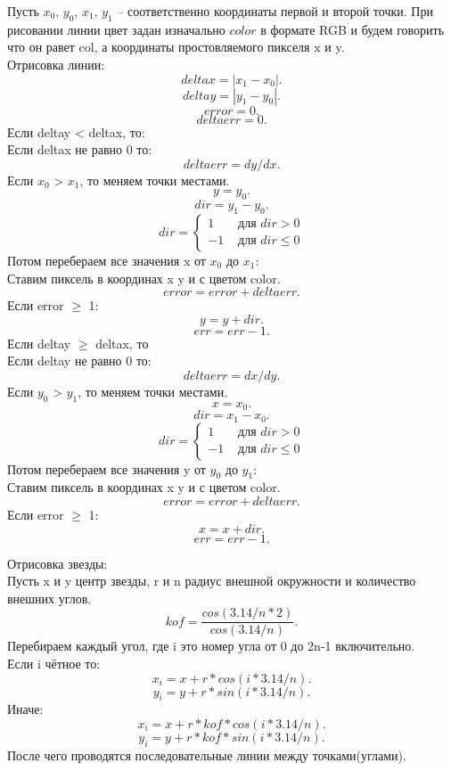 \documentclass[14pt, a4paper]{extreport}
\begin{document}
Пусть $x_0$, $y_0$, $x_1$, $y_1$ -- соответственно координаты первой и второй точки.
При рисовании линии цвет задан изначально $color$ в формате RGB и будем говорить что он равет col, а координаты простовляемого пикселя x и y.\\
Отрисовка линии:
$$ deltax = |x_1-x_0| . $$
$$ deltay = |y_1-y_0| . $$
$$ error = 0 . $$
$$ deltaerr = 0 . $$
Если deltay < deltax, то:\\
Если deltax не равно 0 то:
$$ deltaerr = dy/dx . $$
Если $x_0$ > $x_1$, то меняем точки местами.
$$ y = y_0 . $$
$$ dir = y_1-y_0 . $$
\begin{equation*}
dir =
\left\{
\begin{array}{lr}
1 & \text{ для } dir > 0 \\
-1 & \text{ для } dir \leq 0
\end{array}
\right.
\end{equation*}
Потом перебераем все значения x от $x_0$ до $x_1$:\\
Ставим пиксель в координах x y и с цветом color.
$$ error = error+deltaerr . $$
Если error $\geq$ 1:
$$ y = y+dir. $$
$$ err = err-1. $$
Если deltay $\geq$ deltax, то\\
Если deltay не равно 0 то:
$$ deltaerr = dx/dy . $$
Если $y_0$ > $y_1$, то меняем точки местами.
$$ x = x_0 . $$
$$ dir = x_1-x_0 . $$
\begin{equation*}
dir =
\left\{
\begin{array}{lr}
1 & \text{ для } dir > 0 \\
-1 & \text{ для } dir \leq 0
\end{array}
\right.
\end{equation*}
Потом перебераем все значения y от $y_0$ до $y_1$:\\
Ставим пиксель в координах x y и с цветом color.
$$ error = error+deltaerr . $$
Если error $\geq$ 1:
$$ x = x+dir. $$
$$ err = err-1. $$

Отрисовка звезды:\\
Пусть x и y центр звезды, r и n радиус внешной окружности и количество внешних углов.
$$ kof = \frac{cos(3.14/n*2)}{cos(3.14/n)} . $$
Перебираем каждый угол, где i это номер угла от 0 до 2n-1 включительно.\\
Если i чётное то:
$$ x_{i} = x+r*cos(i*3.14/n) . $$
$$ y_{i} = y+r*sin(i*3.14/n) . $$
Иначе:
$$ x_{i} = x+r*kof*cos(i*3.14/n) . $$
$$ y_{i} = y+r*kof*sin(i*3.14/n) . $$
После чего проводятся последовательные линии между точками(углами).

\end{document}
